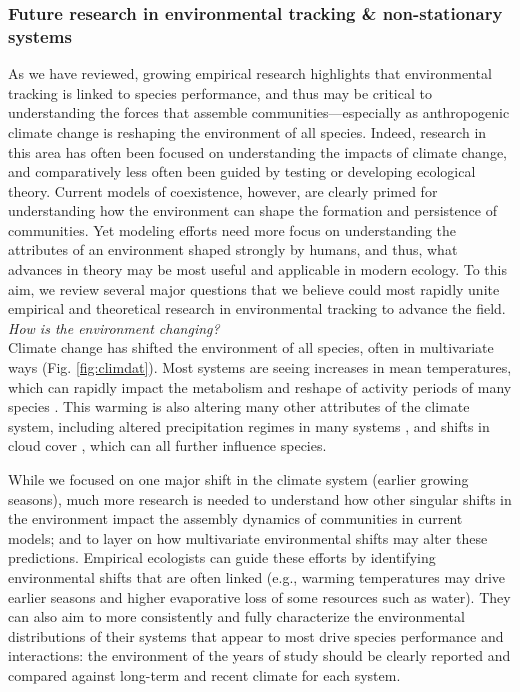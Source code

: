 \documentclass[11pt,letterpaper]{article}
\begin{document}
\subsubsection{Future research in environmental tracking \& non-stationary systems}
As we have reviewed, growing empirical research highlights that environmental tracking is linked to species performance, and thus may be critical to understanding the forces that assemble communities---especially as anthropogenic climate change is reshaping the environment of all species. Indeed, research in this area has often been focused on understanding the impacts of climate change, and comparatively less often been guided by testing or developing ecological theory. Current models of coexistence, however, are clearly primed for understanding how the environment can shape the formation and persistence of communities. Yet modeling efforts need more focus on understanding the attributes of an environment shaped strongly by humans, and thus, what advances in theory may be most useful and applicable in modern ecology. To this aim, we review several major questions that we believe could most rapidly unite empirical and theoretical research in environmental tracking to advance the field.\\

\emph{How is the environment changing?} \\ %

Climate change has shifted the environment of all species, often in multivariate ways (Fig. \ref{fig:climdat}). Most systems are seeing increases in mean temperatures, which can rapidly impact the metabolism and reshape of activity periods of many species \citep{Monson:2006vt,IPCC:2014sm}. This warming is also altering many other attributes of the climate system, including altered precipitation regimes in many systems \citep{Diffenbaugh2015}, and shifts in cloud cover \citep{hofer2017}, which can all further influence species. 

While we focused on one major shift in the climate system (earlier growing seasons), much more research is needed to understand how other singular shifts in the environment impact the assembly dynamics of communities in current models; and to layer on how multivariate environmental shifts may alter these predictions. Empirical ecologists can guide these efforts by identifying environmental shifts that are often linked (e.g., warming temperatures may drive earlier seasons and higher evaporative loss of some resources such as water). They can also aim to more consistently and fully characterize the environmental distributions of their systems that appear to most drive species performance and interactions: the environment of the years of study should be clearly reported and compared against long-term and recent climate for each system.\\
\end{document}
